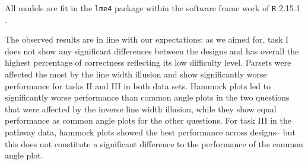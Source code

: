 All models are fit in the {\tt lme4} package \citep{lmer} within the software frame work of {\tt R} 2.15.1 \citep{R}.


The observed results are in line with our expectations:
as we aimed for, task I does not show any significant differences between the designs and has overall the highest percentage of correctness reflecting its low difficulty level.
Parsets were affected the most by the line width illusion and show significantly worse performance for tasks II and III in both data sets. 
Hammock plots led to significantly worse performance than common angle plots in the two questions that were affected by the inverse line width illusion, while they show equal performance as common angle plots for the other questions. For task III in the pathway data,  hammock plots showed the best performance  across designs-- but this  does not  constitute a significant difference to the performance of the common angle plot.

%

